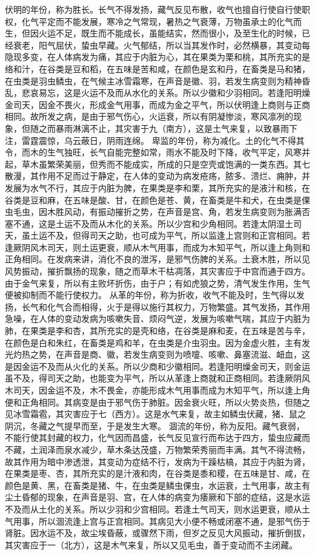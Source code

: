 \documentclass[a4paper,12pt,UTF8,twoside]{ctexbook}
\begin{document}
伏明的年份，称为胜长。长气不得发扬，藏气反见布散，收气也擅自行使自行使职权，化气平定而不能发展，寒冷之气常现，暑热之气衰薄，万物虽承土的化气而生，但因火运不足，既生而不能成长，虽能结实，然而很小，及至生化的时候，已经衰老，阳气屈伏，蛰虫早藏。火气郁结，所以当其发作时，必然横暴，其变动每隐现多变，在人体病发为痛，其应于内脏为心，其在果类为栗和桃，其所充实的是络和汁，在谷类是豆和稻，在五味是苦和咸，在颜色是玄和丹，在畜类是马和猪，在虫类是羽虫鳞虫，在气候主冰雪霜寒，在声音是徽、羽，若发生病变则为精神昏乱，悲哀易忘，这是火运不及而从水化的关系。所以少徽和少羽相同。若逢阳明燥金司天，因金不畏火，形成金气用事，而成为金之平气，所以伏明逢上商则与正商相同。故所发之病，是由于邪气伤心，火运衰，所以有阴凝惨淡，寒风凛冽的现象，但随之而暴雨淋漓不止，其灾害于九（南方），这是土气来复，以致暴雨下注，雷霆震惊，乌云蔽日，阴雨连绵。
卑监的年份，称为减化。土的化气不得其令，而木的生气独旺，长气自能完整如常，雨水不能及时下降，收气平定，风寒并起，草木虽繁荣美丽，但秀而不能成实，所成的只是空壳或饱满的一类东西。其七散漫，其作用不足而过于静定，在人体的变动为病发疮疡，脓多、溃烂、痈肿，并发展为水气不行，其应于内脏为脾，在果类是李和栗，其所充实的是液汁和核，在谷类是豆和麻，在五味是酸、甘，在颜色是苍、黄，在畜类是牛和犬，在虫类是倮虫毛虫，因木胜风动，有振动摧折之势，在声音是宫、角，若发生病变则为胀满否塞不通，这是土运不及而从木化的关系。所以少宫和少角相同。若逢太阴湿土司天，虽土运不及，但得司天之助，也可成为平气，所以监逢上宫则和正宫相同。若逢厥阴风木司天，则土运更衰，顺从木气用事，而成为木知平气，所以逢上角则和正角相同。在发病来讲，消化不良的泄泻，是邪气伤脾的关系。土衰木胜，所以见风势振动，摧折飘扬的现象，随之而草木干枯凋落，其灾害应于中宫而通于四方。由于金气来复，所以有主败坏折伤，由于户；有如虎狼之势，清气发生作用，生气便被抑制而不能行使权力。
从革的年份，称为折收，收气不能及时，生气得以发扬，长气和化气合而相得，火于是得以施行其权力，万物繁盛。其气发扬，其作用急噪，在人体的变动发病为咳嗽失音、烦闷气逆，发展为咳嗽气喘，其应于内脏为肺，在果类是李和杏，其所充实的是壳和络，在谷类是麻和麦，在五味是苦与辛，在颜色是白和朱红，在畜类是鸡和羊，在虫类是介虫羽虫。因为金虚火胜，主有发光灼热之势，在声音是商、徽，若发生病变则为喷嚏、咳嗽、鼻塞流滋、衄血，这是因金运不及而从火化的关系。所以少商和少徽相同。若逢阳明燥金司天，则金运虽不及，得司天之助，也能变为平气，所以从革逢上商就和正商相同。若逢厥阴风木司天，因金运不及，木不畏金，亦能形成木气用事而成为木知平气，所以逢上角便和正角相同。其病变是由于邪气伤于肺脏。因金衰火旺，所以火势炎热，但随之见冰雪霜雹，其灾害应于七（西方）。这是水气来复，故主如鳞虫伏藏，猪、鼠之阴沉，冬藏之气提早而至，于是发生大寒。
涸流的年份，称为反阳。藏气衰弱，不能行使其封藏的权力，化气因而昌盛，长气反见宣行而布达于四方，蛰虫应藏而不藏，土润泽而泉水减少，草木条达茂盛，万物繁荣秀丽而丰满。其气不得流畅，故其作用为暗中渗透泄，其变动为症结不行，发病为干躁枯槁，其应于内脏为肾，在果类是枣、杏，其所充实的是汁液和肉，在谷类是黍和稷，在五味是甘、咸，在颜色是黄、黑，在畜类是猪、牛，在虫类是鳞虫倮虫，水运衰，土气用事，故主有尘土昏郁的现象，在声音是羽、宫，在人体的病变为痿厥和下部的症结，这是水运不及而从土化的关系。所以少羽和少宫相同。若逢土气司天，则水运更衰，顺从土气用事，所以涸流逢上宫与正宫相同。其病见大小便不畅或闭塞不通，是邪气伤于肾脏。因水运不及，故尘埃昏蔽，或骤然下雨，但岁之反见大风振动，摧折倒拔，其灾害应于一（北方），这是木气来复，所以又见毛虫，善于变动而不主闭藏。
\end{document}
